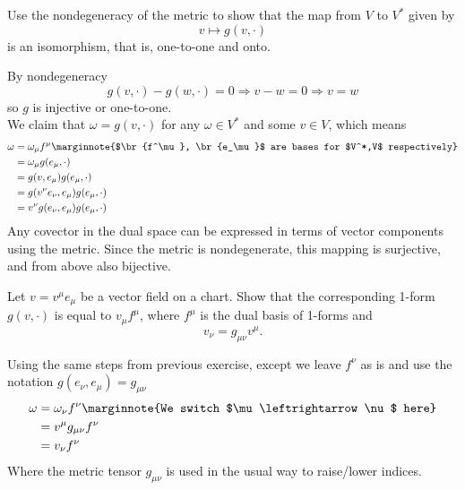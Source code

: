 \documentclass[10pt]{article}
\begin{document}
\begin{example}
	Use the nondegeneracy of the metric to show that the map from $V$ to $V^*$ given by
	$$
		v \mapsto g(v,\cdot)
	$$
	is an isomorphism, that is, one-to-one and onto.
\end{example}
\sol By nondegeneracy
$$
g(v,\cdot)-g(w,\cdot)=0 \Rightarrow v-w=0 \Rightarrow v=w
$$
so $g$ is injective or one-to-one.\\
We claim that $\omega=g(v,\cdot)$ for any $\omega \in V^*$ and some $v \in V$, which means
$$
\begin{aligned}
	\omega &= \omega_\mu f^\mu\marginnote{$\br{f^\mu}, \br{e_\mu}$ are bases for $V^*,V$ respectively}\\
	&= \omega_\mu g(e_\mu, \cdot)\\
	&= g(v, e_\mu) g(e_\mu, \cdot)\\
	&= g(v^\nu e_\nu, e_\mu) g(e_\mu, \cdot)\\
	&= v^\nu g(e_\nu, e_\mu) g(e_\mu, \cdot)
\end{aligned}
$$
Any covector in the dual space can be expressed in terms of vector components using the metric. Since the metric is nondegenerate, this mapping is surjective, and from above also bijective.


\begin{example}
	Let $v=v^\mu e_\mu$ be a vector field on a chart. Show that the corresponding 1-form $g(v,\cdot)$ is equal to $v_\mu f^\mu$, where $f^\mu$ is the dual basis of 1-forms and
	$$
		v_\nu = g_{\mu\nu}v^\mu.
	$$
\end{example}
\sol Using the same steps from previous exercise, except we leave $f^\nu$ as is and use the notation $g(e_\nu, e_\mu) = g_{\mu\nu}$
$$
\begin{aligned}
	\omega &= \omega_\nu f^\nu\marginnote{We switch $\mu \leftrightarrow \nu$ here}\\
	&= v^\mu g_{\mu\nu} f^\nu\\
	&= v_\nu f^\nu
\end{aligned}
$$
Where the metric tensor $g_{\mu\nu}$ is used in the usual way to raise/lower indices.
\end{document}
